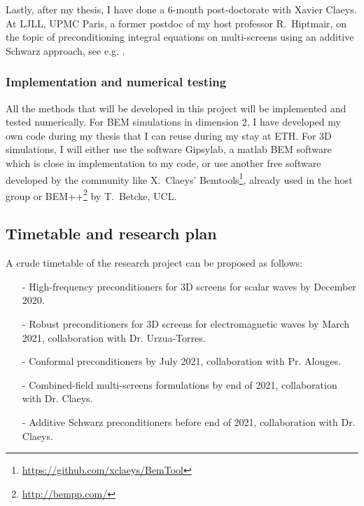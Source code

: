 \documentclass[]{report}
\begin{document}
Lastly, after my thesis, I have done a 6-month post-doctorate with Xavier Claeys. At LJLL,
UPMC Paris, a former postdoc of my host professor R.~Hiptmair, on the topic of preconditioning integral
equations on multi-screens using an additive Schwarz approach, see e.g. \cite{marchand2019two}.

\subsubsection*{Implementation and numerical testing}

All the methods that will be developed in this project will be implemented and tested
numerically. For BEM simulations in dimension 2, I have developed my own code during my
thesis that I can reuse during my stay at ETH. For 3D simulations, I will either use the
software Gipsylab, a matlab BEM software which is close in implementation to my code, or
use another free software developed by the community like X.~Claeys'
Bemtools\footnote{\url{https://github.com/xclaeys/BemTool}}, already used in the host group
or BEM++\footnote{\url{http://bempp.com/}} by T.~Betcke, UCL.

\subsection{Timetable and research plan}

A crude timetable of the research project can be proposed as follows:
\begin{itemize}\itemsep-0.2em 
\item[-] High-frequency preconditioners for 3D screens for scalar waves by December 2020.
\item[-] Robust preconditioners for 3D screens for electromagnetic waves by March 2021,
  collaboration with Dr. Urzua-Torres.
\item[-] Conformal preconditioners by July 2021, collaboration with Pr. Alouges. 
\item[-] Combined-field multi-screens formulations by end of 2021, collaboration with Dr. Claeys. 
\item[-] Additive Schwarz preconditioners before end of 2021, collaboration with Dr. Claeys.
\end{itemize}
\end{document}
